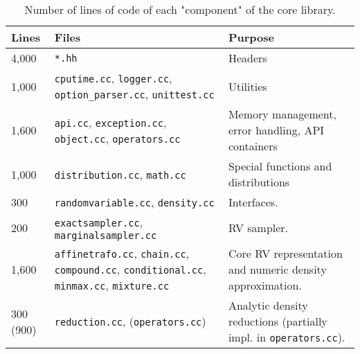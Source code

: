 \documentclass[a4paper, 10pt]{article}
\begin{document}
\begin{table}
 \begin{tabular}{p{}|p{}|p{}}
  Lines & Files & Purpose  \\  \hline
  4,000 & \texttt{*.hh} & Headers \\
  1,000 & \texttt{cputime.cc}, \texttt{logger.cc}, \texttt{option\_parser.cc},  \texttt{unittest.cc} & Utilities \\
  1,600 & \texttt{api.cc}, \texttt{exception.cc}, \texttt{object.cc}, \texttt{operators.cc} & Memory management, error handling, API containers \\
  1,000 & \texttt{distribution.cc}, \texttt{math.cc} & Special functions and distributions \\
  300 & \texttt{randomvariable.cc}, \texttt{density.cc} & Interfaces. \\
  200 & \texttt{exactsampler.cc}, \texttt{marginalsampler.cc} & RV sampler. \\ \hline
  1,600 & \texttt{affinetrafo.cc}, \texttt{chain.cc}, \texttt{compound.cc}, \texttt{conditional.cc},  \texttt{minmax.cc}, \texttt{mixture.cc} & Core RV representation and numeric density approximation.\\
  300 (900) & \texttt{reduction.cc}, (\texttt{operators.cc}) & Analytic density reductions (partially impl. in \texttt{operators.cc}). \\
\end{tabular}
\caption{Number of lines of code of each "component" of the core library.} \label{tab:lines}
\end{table}
\end{document}
